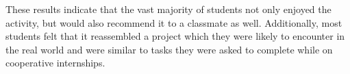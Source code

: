 \documentclass[conference]{IEEEtran}
\newcommand{\todo}[1]{\textcolor{cyan}{\textbf{[#1]}}}
\begin{document}




These results indicate that the vast majority of students not only enjoyed the activity, but would also recommend it to a classmate as well. Additionally, most students felt that it reassembled a project which they were likely to encounter in the real world and were similar to tasks they were asked to complete while on cooperative internships.








\end{document}

